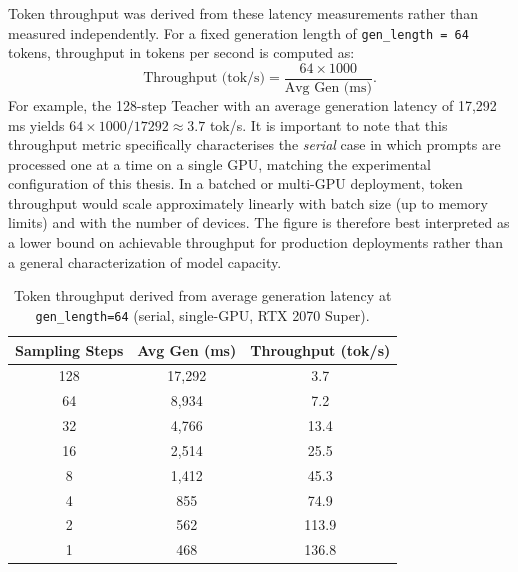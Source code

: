 \documentclass[11pt, a4paper]{article}
\begin{document}
Token throughput was derived from these latency measurements rather than measured independently. For a fixed generation length of \texttt{gen\_length = 64} tokens, throughput in tokens per second is computed as:
\begin{equation}
    \text{Throughput (tok/s)} = \frac{64 \times 1000}{\text{Avg Gen (ms)}}.
    \label{eq:throughput}
\end{equation}
For example, the 128-step Teacher with an average generation latency of 17{,}292 ms yields $64 \times 1000 / 17292 \approx 3.7$ tok/s. It is important to note that this throughput metric specifically characterises the \emph{serial} case in which prompts are processed one at a time on a single GPU, matching the experimental configuration of this thesis. In a batched or multi-GPU deployment, token throughput would scale approximately linearly with batch size (up to memory limits) and with the number of devices. The figure is therefore best interpreted as a lower bound on achievable throughput for production deployments rather than a general characterization of model capacity.

\begin{table}[H]
\centering
\caption{Token throughput derived from average generation latency at \texttt{gen\_length=64} (serial, single-GPU, RTX 2070 Super).}
\label{tab:throughput}
\begin{tabular}{@{}ccc@{}}
\toprule
\textbf{Sampling Steps} & \textbf{Avg Gen (ms)} & \textbf{Throughput (tok/s)} \\ \midrule
128 & 17,292 & 3.7   \\
64  & 8,934  & 7.2   \\
32  & 4,766  & 13.4  \\
16  & 2,514  & 25.5  \\
8   & 1,412  & 45.3  \\
4   & 855    & 74.9  \\
2   & 562    & 113.9 \\
1   & 468    & 136.8 \\ \bottomrule
\end{tabular}
\end{table}
\end{document}
